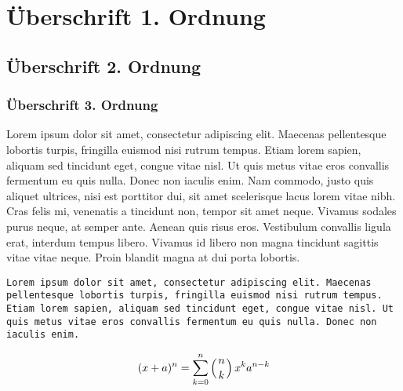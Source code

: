 \documentclass[11pt]{scrartcl}
\begin{document}
 
\section{Überschrift 1. Ordnung}
\subsection{Überschrift 2. Ordnung}
\subsubsection{Überschrift 3. Ordnung}
 
Lorem ipsum dolor sit amet, consectetur adipiscing elit. Maecenas pellentesque lobortis turpis, fringilla euismod nisi rutrum tempus. Etiam lorem sapien, aliquam sed tincidunt eget, congue vitae nisl. Ut quis metus vitae eros convallis fermentum eu quis nulla. Donec non iaculis enim. Nam commodo, justo quis aliquet ultrices, nisi est porttitor dui, sit amet scelerisque lacus lorem vitae nibh. Cras felis mi, venenatis a tincidunt non, tempor sit amet neque. Vivamus sodales purus neque, at semper ante. Aenean quis risus eros. Vestibulum convallis ligula erat, interdum tempus libero. Vivamus id libero non magna tincidunt sagittis vitae vitae neque. Proin blandit magna at dui porta lobortis. 
 
\texttt{Lorem ipsum dolor sit amet, consectetur adipiscing elit. Maecenas pellentesque lobortis turpis, fringilla euismod nisi rutrum tempus. Etiam lorem sapien, aliquam sed tincidunt eget, congue vitae nisl. Ut quis metus vitae eros convallis fermentum eu quis nulla. Donec non iaculis enim.}
 
\begin{equation}
(x+a)^n = \sum_{k=0}^n \left(n\atop k \right) x^k a^{n-k}
\end{equation} 
 
\end{document}
